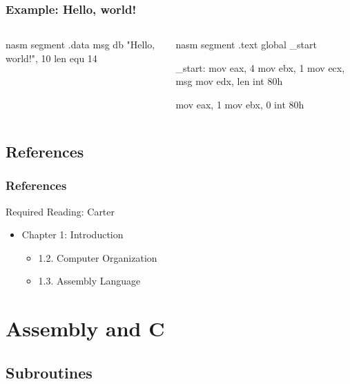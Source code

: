 \documentclass[dvipsnames]{beamer}
\begin{document}
\begin{frame}[fragile]
  \frametitle{Example: Hello, world!}

    \begin{columns}[t]
      \begin{pygments}{nasm}
segment .data
msg db  "Hello, world!", 10
len equ 14
      \end{pygments}

      \begin{pygments}{nasm}
segment .text
global _start

_start:
    mov  eax, 4
    mov  ebx, 1
    mov  ecx, msg
    mov  edx, len
    int  80h

    mov  eax, 1
    mov  ebx, 0
    int  80h
      \end{pygments}
    \end{columns}
\end{frame}

\subsection*{References}

\begin{frame}
  \frametitle{References}

  \begin{block}{Required Reading: Carter}
    \begin{itemize}
      \item Chapter 1: Introduction
      \begin{itemize}
        \item 1.2. \alert{Computer Organization}
        \item 1.3. \alert{Assembly Language}
      \end{itemize}
    \end{itemize}
  \end{block}
\end{frame}

\section{Assembly and C}

\subsection{Subroutines}
\end{document}
